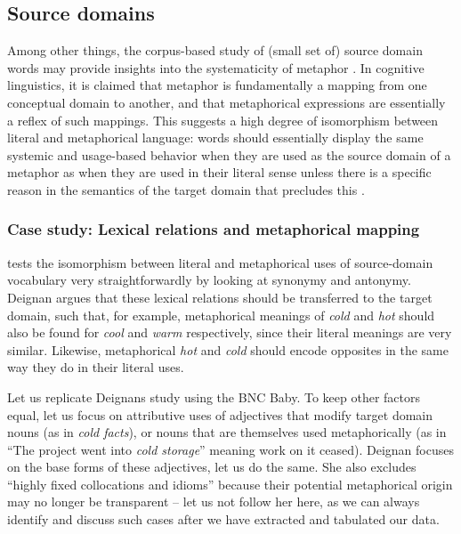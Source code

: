 \subsection{Source domains}
\label{sec:sourcedomains}

Among other things, the corpus\hyp{}based study of (small set of) source domain words may provide insights into the systematicity of metaphor  \citep[cf. esp.][]{deignan_metaphorical_1999}. In cognitive  linguistics, it is claimed that metaphor is fundamentally a mapping from one conceptual  domain to another, and that metaphorical expressions are essentially a reflex of such mappings. This suggests a high degree of isomorphism between literal  and metaphorical  language: words should essentially display the same systemic and usage\hyp{}based behavior when they are used as the source domain of a metaphor as when they are used in their literal sense unless there is a specific reason in the semantics  of the target domain that precludes this \citep{lakoff_contemporary_1993}.

\subsubsection{Case study: Lexical relations and metaphorical mapping}
\label{sec:antonymymetaphor}

\citet{deignan_metaphorical_1999} tests the isomorphism between literal  and metaphorical  uses of source\hyp{}domain vocabulary very straightforwardly by looking at synonymy  and antonymy.  Deignan argues that these lexical relations should be transferred to the target domain, such that, for example, metaphorical meanings  of \textit{cold} and \textit{hot} should also be found for \textit{cool} and \textit{warm} respectively, since their literal meanings are very similar. Likewise, metaphorical  \textit{hot} and \textit{cold} should encode opposites in the same way they do in their literal  uses.

Let us replicate  Deignans study using the BNC Baby.  To keep other factors equal, let us focus on attributive uses of adjectives  that modify target domain nouns  (as in \textit{cold facts}), or nouns that are themselves used metaphorically (as in ``The project went into \textit{cold storage}'' meaning work on it ceased). Deignan focuses on the base forms of these adjectives,  let us do the same. She also excludes ``highly fixed collocations  and idioms''  because their potential metaphorical  origin may no longer be transparent -- let us not follow her here, as we can always identify and discuss such cases after we have extracted  and tabulated our data.


